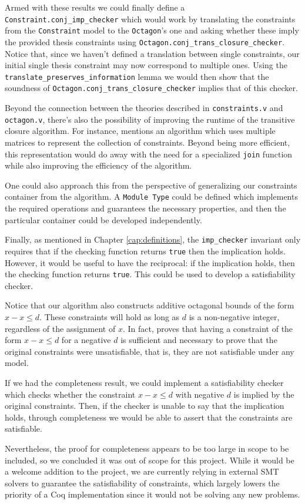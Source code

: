 Armed with these results we could finally define a \texttt{Constraint.conj_imp_checker}
which would work by translating the constraints from the \texttt{Constraint} model to
the \texttt{Octagon}'s one and asking whether these imply the provided thesis constraints
using \texttt{Octagon.conj_trans_closure_checker}. Notice that, since we haven't defined
a translation between single constraints, our initial single thesis constraint may now correspond
to multiple ones. Using the \texttt{translate_preserves_information} lemma we would then
show that the soundness of \texttt{Octagon.conj_trans_closure_checker} implies that of 
this checker.

Beyond the connection between the theories described in \texttt{constraints.v} and 
\texttt{octagon.v}, there's also the possibility of improving the runtime of the
transitive closure algorithm. For instance, \cite{TransitiveClosure} mentions an algorithm which
uses multiple matrices to represent the collection of constraints. Beyond being more efficient, 
this representation would do away with the need for a specialized \texttt{join} function
while also improving the efficiency of the algorithm.

One could also approach this from the perspective of generalizing our constraints container from
the algorithm. A \texttt{Module Type} could be defined which implements the required 
operations and guarantees the necessary properties, and then the particular container could be
developed independently.

Finally, as mentioned in Chapter \ref{cap:definitions}, the \texttt{imp_checker} invariant
only requires that if the checking function returns \texttt{true} then the implication
holds. However, it would be useful to have the reciprocal: if the implication holds, then the checking
function returns \texttt{true}. This could be used to develop a satisfiability checker.

Notice that our algorithm also constructs additive octagonal bounds of the form $x - x \le d$.
These constraints will hold as long as $d$ is a non-negative integer, regardless of the assignment
of $x$. In fact, \cite{HarveyStuckey} proves that having a constraint of the form $x - x \le d$
for a negative $d$ is sufficient and necessary to prove that the original constraints were 
unsatisfiable, that is, they are not satisfiable under any model.

If we had the completeness result, we could implement a satisfiability checker which checks 
whether the constraint $x - x \le d$ with negative $d$ is implied by the original constraints.
Then, if the checker is unable to say that the implication holds, through completeness we would
be able to assert that the constraints are satisfiable.

Nevertheless, the proof for completeness appears to be too large in scope to be included, so we
concluded it was out of scope for this project. While it would be a welcome addition to the project,
we are currently relying in external SMT solvers to guarantee the satisfiability of constraints, 
which largely lowers the priority of a Coq implementation since it would not be solving any new
problems.